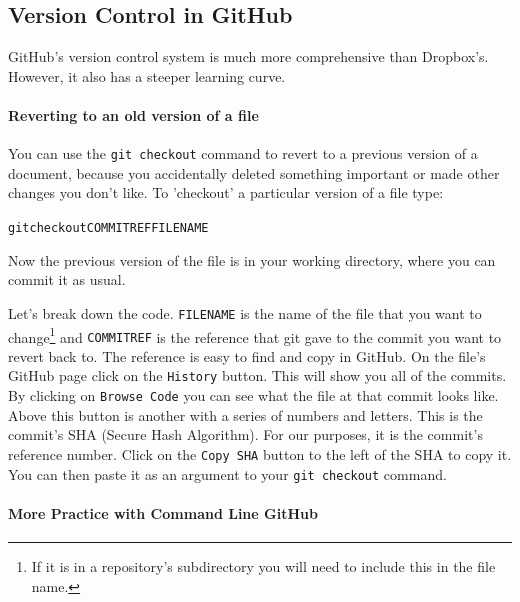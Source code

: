 \documentclass[ChapterTOCs,krantz1]{krantz}\usepackage{graphicx, color}
\makeatletter
\newenvironment{kframe}{%
 \def\at@end@of@kframe{}%
 \ifinner\ifhmode%
  \def\at@end@of@kframe{\end{minipage}}%
  \begin{minipage}{\columnwidth}%
 \fi\fi%
 \def\FrameCommand##1{\hskip\@totalleftmargin \hskip-\fboxsep
 \colorbox{shadecolor}{##1}\hskip-\fboxsep
     \hskip-\linewidth \hskip-\@totalleftmargin \hskip\columnwidth}%
 \MakeFramed {\advance\hsize-\width
   \@totalleftmargin\z@ \linewidth\hsize
   \@setminipage}}%
 {\par\unskip\endMakeFramed%
 \at@end@of@kframe}
\newenvironment{knitrout}{}{} %
\makeatother
\begin{document}
\subsection{Version Control in GitHub}

GitHub's version control system is much more comprehensive than Dropbox's. However, it also has a steeper learning curve.

\paragraph{Reverting to an old version of a file}

You can use the {\tt{git checkout}} command to revert to a previous version of a document, because you accidentally deleted something important or made other changes you don't like. To 'checkout' a particular version of a file type:

\begin{knitrout}
\color{fgcolor}\begin{kframe}
\begin{alltt}
git checkout COMMITREF FILENAME
\end{alltt}
\end{kframe}
\end{knitrout}


\noindent Now the previous version of the file is in your working directory, where you can commit it as usual.

Let's break down the code.  {\tt{FILENAME}} is the name of the file that you want to change\footnote{If it is in a repository's subdirectory you will need to include this in the file name.} and {\tt{COMMITREF}} is the reference that git gave to the commit you want to revert back to. The reference is easy to find and copy in GitHub. On the file's GitHub page click on the {\tt{History}} button. This will show you all of the commits. By clicking on {\tt{Browse Code}} you can see what the file at that commit looks like. Above this button is another with a series of numbers and letters. This is the commit's SHA (Secure Hash Algorithm). For our purposes, it is the commit's reference number. Click on the {\tt{Copy SHA}} button to the left of the SHA to copy it. You can then paste it as an argument to your {\tt{git checkout}} command. 

\paragraph{More Practice with Command Line GitHub}
\end{document}

